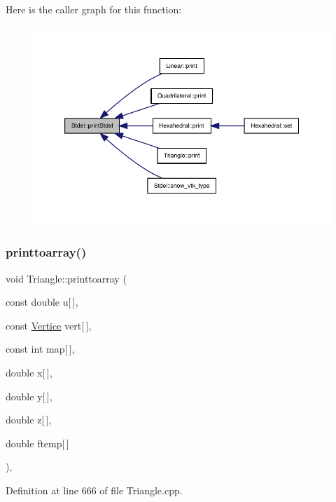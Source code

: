 Here is the caller graph for this function\+:
\nopagebreak
\begin{figure}[H]
\begin{center}
\leavevmode
\includegraphics[width=350pt]{classStdel_a54b5768d09f500cb949e66fc234eac70_icgraph}
\end{center}
\end{figure}
\mbox{\label{classTriangle_a1a32c77e254ebee6c225720d99e8ef12}} 
\subsubsection{\texorpdfstring{printtoarray()}{printtoarray()}}
{\footnotesize\ttfamily void Triangle\+::printtoarray (\begin{DoxyParamCaption}\item[{const double}]{u\mbox{[}$\,$\mbox{]},  }\item[{const \hyperlink{structVertice}{Vertice}}]{vert\mbox{[}$\,$\mbox{]},  }\item[{const int}]{map\mbox{[}$\,$\mbox{]},  }\item[{double}]{x\mbox{[}$\,$\mbox{]},  }\item[{double}]{y\mbox{[}$\,$\mbox{]},  }\item[{double}]{z\mbox{[}$\,$\mbox{]},  }\item[{double}]{ftemp\mbox{[}$\,$\mbox{]} }\end{DoxyParamCaption})\hspace{0.3cm}{\ttfamily [private]}, {\ttfamily [virtual]}}



Definition at line 666 of file Triangle.\+cpp.



